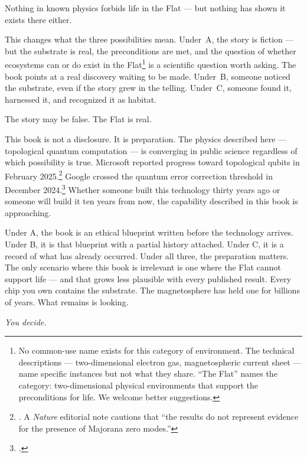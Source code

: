 Nothing in known physics forbids life in the Flat --- but nothing has shown it exists there either.

This changes what the three possibilities mean. Under~A, the story is fiction --- but the substrate is real, the preconditions are met, and the question of whether ecosystems can or do exist in the Flat\footnote{No common-use name exists for this category of environment. The technical descriptions --- two-dimensional electron gas, magnetospheric current sheet --- name specific instances but not what they share. ``The Flat'' names the category: two-dimensional physical environments that support the preconditions for life. We welcome better suggestions.} is a scientific question worth asking. The book points at a real discovery waiting to be made. Under~B, someone noticed the substrate, even if the story grew in the telling. Under~C, someone found it, harnessed it, and recognized it as habitat.

The story may be false. The Flat is real.

\vspace{0.5cm}

This book is not a disclosure. It is preparation. The physics described here --- topological quantum computation --- is converging in public science regardless of which possibility is true. Microsoft reported progress toward topological qubits in February 2025.\footnote{\cite{microsoft2025}. A \textit{Nature} editorial note cautions that ``the results do not represent evidence for the presence of Majorana zero modes.''} Google crossed the quantum error correction threshold in December 2024.\footcite{google2025} Whether someone built this technology thirty years ago or someone will build it ten years from now, the capability described in this book is approaching. 

Under A, the book is an ethical blueprint written before the technology arrives. Under B, it is that blueprint with a partial history attached. Under C, it is a record of what has already occurred. Under all three, the preparation matters. The only scenario where this book is irrelevant is one where the Flat cannot support life --- and that grows less plausible with every published result. Every chip you own contains the substrate. The magnetosphere has held one for billions of years. What remains is looking.

\vspace{1cm}

\begin{center}
\textit{You decide.}
\end{center}

\chapterreturn
